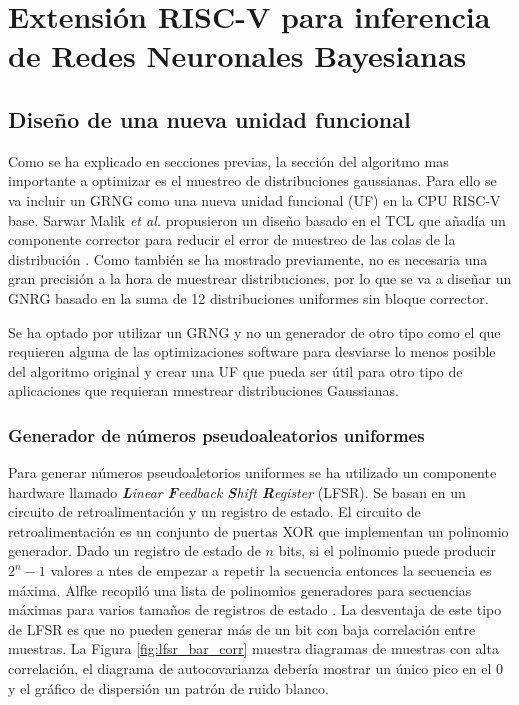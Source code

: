 \chapter{Extensión RISC-V para inferencia de Redes Neuronales Bayesianas} \label{ch:extension}

\section{Diseño de una nueva unidad funcional}

Como se ha explicado en secciones previas, la sección del algoritmo mas importante a optimizar es el muestreo de distribuciones gaussianas. Para ello se va incluir un GRNG como una nueva unidad funcional (UF) en la CPU RISC-V base. Sarwar Malik \emph{et al.} propusieron un diseño basado en el TCL que añadía un componente corrector para reducir el error de muestreo de las colas de la distribución \cite{clt_grng} . Como también se ha mostrado previamente, no es necesaria una gran precisión a la hora de muestrear distribuciones, por lo que se va a diseñar un GNRG basado en la suma de 12 distribuciones uniformes sin bloque corrector. 

Se ha optado por utilizar un GRNG y no un generador de otro tipo como el que requieren alguna de las optimizaciones software para desviarse lo menos posible del algoritmo original y crear una UF que pueda ser útil para otro tipo de aplicaciones que requieran muestrear distribuciones Gaussianas.

\subsection{Generador de números pseudoaleatorios uniformes}

Para generar números pseudoaletorios uniformes se ha utilizado un componente hardware llamado \textit{\textbf{L}inear \textbf{F}eedback \textbf{S}hift \textbf{R}egister} (LFSR). Se basan en un circuito de retroalimentación y un registro de estado. El circuito de retroalimentación es un conjunto de puertas XOR que implementan un polinomio generador. Dado un registro de estado de $n$ bits, si el polinomio puede producir $2^n-1$ valores a
ntes de empezar a repetir la secuencia entonces la secuencia es máxima. Alfke recopiló una lista de polinomios generadores para secuencias máximas para varios tamaños de registros de estado \cite{lfsr_poly}. La desventaja de este tipo de LFSR es que no pueden generar más de un bit con baja correlación entre muestras. La Figura \ref{fig:lfsr_bar_corr} muestra diagramas de muestras con alta correlación, el diagrama de autocovarianza debería mostrar un único pico en el 0 y el gráfico de dispersión un patrón de ruido blanco.


